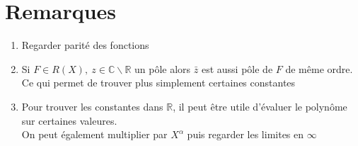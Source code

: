 \documentclass[fleqn]{article}
\theoremstyle{definition} \newtheorem*{defi}{D\'efinition}
\theoremstyle{definition} \newtheorem*{theo}{Th\'eor\`eme}
\theoremstyle{definition} \newtheorem*{coro}{Corollaire}
\theoremstyle{definition} \newtheorem*{nota}{Notation}
\theoremstyle{remark} \newtheorem*{rqs}{Remarques}
\theoremstyle{definition} \newtheorem*{prop}{Propri\'et\'e}
\begin{document}
\section{Remarques}
\begin{enumerate}
	\item Regarder parit\'e des fonctions
	\item Si $F \in R(X),\ z \in \mathbb{C} \backslash \mathbb{R}$ un p\^ole alors $\bar{z}$ est aussi p\^ole de $F$ de m\^eme ordre. Ce qui
		permet de trouver plus simplement certaines constantes
	\item Pour trouver les constantes dans $\mathbb{R}$, il peut \^etre utile d'\'evaluer le polyn\^ome sur certaines valeures.\\ On peut
		\'egalement multiplier par $X^\alpha$ puis regarder les limites en $\infty$
\end{enumerate}
\end{document}
